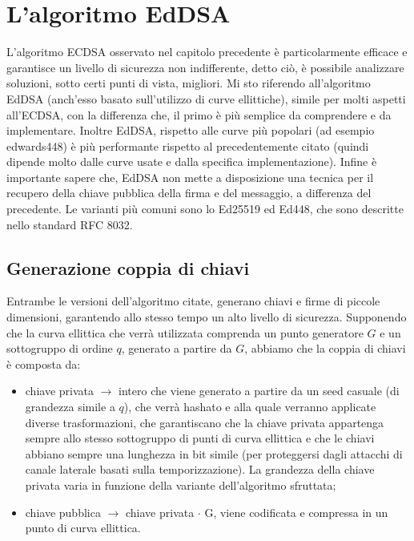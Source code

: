 \chapter{L'algoritmo EdDSA}

L'algoritmo ECDSA osservato nel capitolo precedente è particolarmente efficace e garantisce un livello di sicurezza non indifferente, detto ciò, è possibile analizzare soluzioni, sotto certi punti di vista, migliori. Mi sto riferendo all'algoritmo EdDSA  (anch'esso basato sull'utilizzo di curve ellittiche), simile per molti aspetti all'ECDSA, con la differenza che, il primo è più semplice da comprendere e da implementare. Inoltre EdDSA, rispetto alle curve più popolari (ad esempio edwards448) è più performante rispetto al precedentemente citato (quindi dipende molto dalle curve usate e dalla specifica implementazione). Infine è importante sapere che, EdDSA non mette a disposizione una tecnica per il recupero della chiave pubblica della firma e del messaggio, a differenza del precedente. Le varianti più comuni sono lo Ed25519 ed Ed448, che sono descritte nello standard RFC 8032.

\section{Generazione coppia di chiavi}

Entrambe le versioni dell'algoritmo citate, generano chiavi e firme di piccole dimensioni, garantendo allo stesso tempo un alto livello di sicurezza. Supponendo che la curva ellittica che verrà utilizzata comprenda un punto generatore $G$ e un sottogruppo di ordine $q$, generato a partire da $G$, abbiamo che la coppia di chiavi è composta da:

\begin{itemize}
	\item chiave privata $\rightarrow$ intero che viene generato a partire da un seed casuale (di grandezza simile a $q$), che verrà hashato e alla quale verranno applicate diverse trasformazioni, che garantiscano che la chiave privata appartenga sempre allo stesso sottogruppo di punti di curva ellittica e che le chiavi abbiano sempre una lunghezza in bit simile (per proteggersi dagli attacchi di canale laterale basati sulla temporizzazione). La grandezza della chiave privata varia in funzione della variante dell'algoritmo sfruttata;
	\item chiave pubblica $\rightarrow$ chiave privata $\cdot$ G, viene codificata e compressa in un punto di curva ellittica.
\end{itemize}


